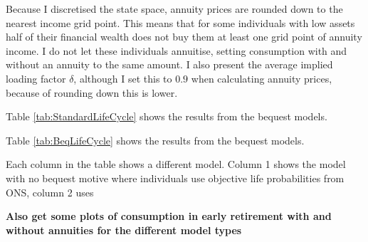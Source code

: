 \documentclass[12pt]{article}
\begin{document}
Because I discretised the state space, annuity prices are rounded down to the nearest income grid point.
This means that for some individuals with low assets half of their financial wealth does not buy them
at least one grid point of annuity income. I do not let these individuals annuitise, setting consumption
with and without an annuity to the same amount. I also present the average implied loading factor
$\delta$, although I set this to $0.9$ when calculating annuity prices, because of rounding down
this is lower.


\begin{landscape}

    
\end{landscape}

Table \ref{tab:StandardLifeCycle} shows the results from the bequest models.



\begin{landscape}
    
\end{landscape}

Table \ref{tab:BeqLifeCycle} shows the results from the bequest models.




Each column in the table shows a different model. Column 1 shows the model with no bequest motive where
individuals use objective life probabilities from ONS, column 2 uses


\textbf{Also get some plots of consumption in early retirement
    with and without annuities for the different model types}





\end{document}
